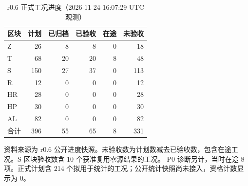 \begin{table}[htbp]
  \centering
  \caption{r0.6 正式工况进度（2026-11-24 16:07:29 UTC 观测）}
  \label{tab:r06-formal-progress-20261124}
  \begin{tabular}{lrrrrr}
    \toprule
    区块 & 计划 & 已归档 & 已验收 & 在途 & 未验收 \\
    \midrule
    Z  & 26  & 8  & 8  & 0 & 18  \\
    T  & 68  & 20 & 20 & 8 & 48  \\
    S  & 150 & 27 & 37 & 0 & 113 \\
    R  & 12  & 0  & 0  & 0 & 12  \\
    HR & 28  & 0  & 0  & 0 & 28  \\
    HP & 30  & 0  & 0  & 0 & 30  \\
    AL & 82  & 0  & 0  & 0 & 82  \\
    \midrule
    合计 & 396 & 55 & 65 & 8 & 331 \\
    \bottomrule
  \end{tabular}
  \par\smallskip
  \begin{minipage}{0.95\linewidth}
    \footnotesize
    资料来源为 r0.6 公开进度快照。未验收数为计划数减去已验收数，包含在途工况。S 区块验收数含 10 个获准复用零源结果的工况。
    P0 诊断另计，当时在途 8 项。正式计划含 214 个拟用于统计的工况；公开统计快照尚未接入，资格计数显示为 0。
  \end{minipage}
\end{table}
